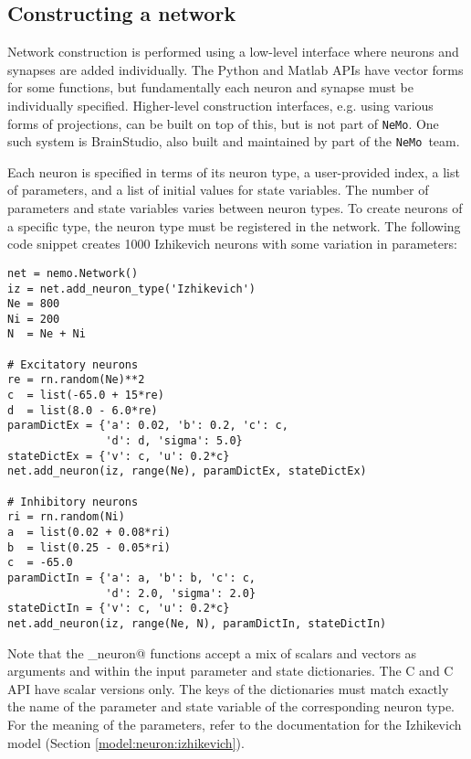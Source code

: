 \documentclass[a4paper]{article}
\newenvironment{mintframe}
  {\begin{mdframed}[linecolor=black, topline=true, bottomline=true,
    leftline=false, rightline=false, backgroundcolor=yellow!13!white,
    nobreak=true]
  }{
  \end{mdframed}
}
\newcommand{\nemo}{\texttt{NeMo}\xspace}
\newcommand{\cpp}{C\nolinebreak\hspace{-.05em}\raisebox{.4ex}{\tiny\bf +}\nolinebreak\hspace{-.10em}\raisebox{.4ex}{\tiny\bf +}\xspace}
\begin{document}
\subsection{Constructing a network}

Network construction is performed using a low-level interface where neurons and
synapses are added individually. The Python and Matlab APIs have vector forms
for some functions, but fundamentally each neuron and synapse must be
individually specified. Higher-level construction interfaces, e.g. using
various forms of projections, can be built on top of this, but is not part of
\nemo. One such system is BrainStudio, also built and maintained by part of the
\nemo\ team.


Each neuron is specified in terms of its neuron type, a user-provided index, a
list of parameters, and a list of initial values for state variables. The
number of parameters and state variables varies between neuron types. To create
neurons of a specific type, the neuron type must be registered in the network.
The following code snippet creates 1000 Izhikevich neurons with some variation
in parameters: 

\begin{mintframe}
\begin{verbatim}
net = nemo.Network()
iz = net.add_neuron_type('Izhikevich')
Ne = 800
Ni = 200
N  = Ne + Ni

# Excitatory neurons
re = rn.random(Ne)**2
c  = list(-65.0 + 15*re)
d  = list(8.0 - 6.0*re)
paramDictEx = {'a': 0.02, 'b': 0.2, 'c': c,
               'd': d, 'sigma': 5.0}
stateDictEx = {'v': c, 'u': 0.2*c}
net.add_neuron(iz, range(Ne), paramDictEx, stateDictEx)

# Inhibitory neurons
ri = rn.random(Ni)
a  = list(0.02 + 0.08*ri)
b  = list(0.25 - 0.05*ri)
c  = -65.0
paramDictIn = {'a': a, 'b': b, 'c': c,
               'd': 2.0, 'sigma': 2.0}
stateDictIn = {'v': c, 'u': 0.2*c}
net.add_neuron(iz, range(Ne, N), paramDictIn, stateDictIn)
\end{verbatim}
\end{mintframe}

Note that the \verb@add_neuron@ functions accept a mix of scalars and vectors
as arguments and within the input parameter and state dictionaries. The \cpp
and C API have scalar versions only. The keys of the dictionaries must match
exactly the name of the parameter and state variable of the corresponding
neuron type. For the meaning of the parameters, refer to the documentation for
the Izhikevich model (Section \ref{model:neuron:izhikevich}).
\end{document}
